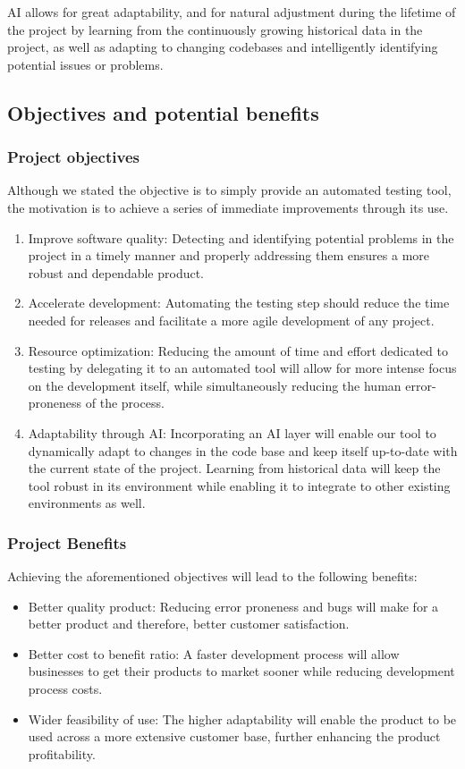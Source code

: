 \documentclass[a4paper, 12pt]{article}
\begin{document}
AI allows for great adaptability, and for natural adjustment during the lifetime of the project by learning from the continuously growing historical data in the project, as well as adapting to changing codebases and intelligently identifying potential issues or problems.

\subsection{Objectives and potential benefits}
\subsubsection{Project objectives}
Although we stated the objective is to simply provide an automated testing tool, the motivation is to achieve a series of immediate improvements through its use.
\begin{enumerate}
    \item Improve software quality: Detecting and identifying potential problems in the project in a timely manner and properly addressing them ensures a more robust and dependable product.
    \item Accelerate development: Automating the testing step should reduce the time needed for releases and facilitate a more agile development of any project.
    \item Resource optimization: Reducing the amount of time and effort dedicated to testing by delegating it to an automated tool will allow for more intense focus on the development itself, while simultaneously reducing the human error-proneness of the process.
    \item Adaptability through AI: Incorporating an AI layer will enable our tool to dynamically adapt to changes in the code base and keep itself up-to-date with the current state of the project. Learning from historical data will keep the tool robust in its environment while enabling it to integrate to other existing environments as well.
\end{enumerate}
\subsubsection{Project Benefits}
Achieving the aforementioned objectives will lead to the following benefits:

\begin{itemize}
    \item Better quality product: Reducing error proneness and bugs will make for a better product and therefore, better customer satisfaction.
    \item Better cost to benefit ratio: A faster development process will allow businesses to get their products to market sooner while reducing development process costs.
    \item Wider feasibility of use: The higher adaptability will enable the product to be used across a more extensive customer base, further enhancing the product profitability.
\end{itemize}
\end{document}
